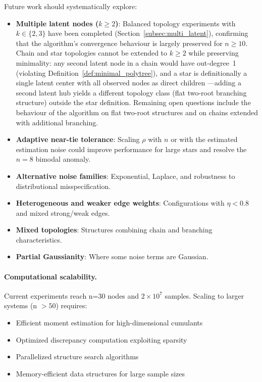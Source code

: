 \documentclass[11pt,a4paper]{article}
\numberwithin{equation}{section}
\begin{document}
\noindent Future work should systematically explore:
\begin{itemize}
\item \textbf{Multiple latent nodes ($k \geq 2$)}: Balanced topology experiments with
$k \in \{2,3\}$ have been completed (Section~\ref{subsec:multi_latent}), confirming
that the algorithm's convergence behaviour is largely preserved for $n \geq 10$.
Chain and star topologies cannot be extended to $k \geq 2$ while preserving minimality:
any second latent node in a chain would have out-degree~1 (violating Definition~\ref{def:minimal_polytree}),
and a star is definitionally a single latent center with all observed nodes as direct
children \citep{etesami:kiyavash:coleman:2016}---adding a second latent hub yields a
different topology class (flat two-root branching structure) outside the star definition.
Remaining open questions include the behaviour of the algorithm on flat two-root structures
and on chains extended with additional branching.
\item \textbf{Adaptive near-tie tolerance}: Scaling $\rho$ with $n$ or with the
estimated estimation noise could improve performance for large stars and resolve the
$n=8$ bimodal anomaly.
\item \textbf{Alternative noise families}: Exponential, Laplace, and robustness to
distributional misspecification.
\item \textbf{Heterogeneous and weaker edge weights}: Configurations with $\eta < 0.8$
and mixed strong/weak edges.
\item \textbf{Mixed topologies}: Structures combining chain and branching characteristics.
\item \textbf{Partial Gaussianity}: Where some noise terms are Gaussian.
\end{itemize}

\paragraph{Computational scalability.} Current experiments reach n=30 nodes and $2 \times 10^7$ samples. Scaling to larger systems (n $> 50$) requires:
\begin{itemize}
\item Efficient moment estimation for high-dimensional cumulants
\item Optimized discrepancy computation exploiting sparsity
\item Parallelized structure search algorithms
\item Memory-efficient data structures for large sample sizes
\end{itemize}
\end{document}
